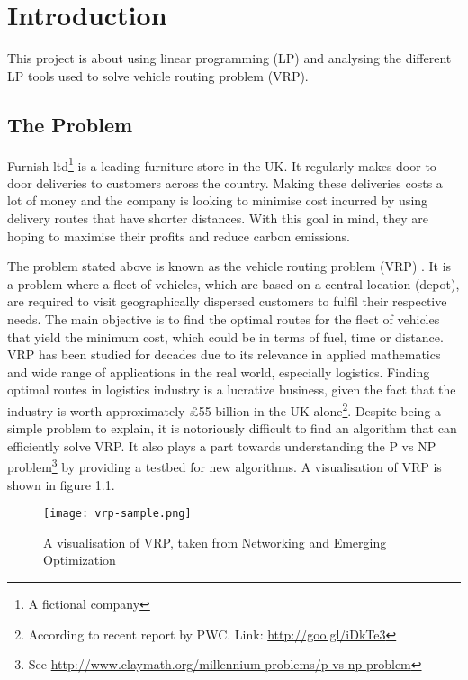 \chapter{Introduction}

This project is about using linear programming (LP) and analysing the different LP tools used to solve vehicle routing problem (VRP).

\section{The Problem}
Furnish ltd\footnote{A fictional company} is a leading furniture store in the UK. It regularly makes door-to-door deliveries to customers
across the country. Making these deliveries costs a lot of money and the company is looking to minimise cost incurred by using delivery routes
that have shorter distances. With this goal in mind, they are hoping to maximise their profits and reduce carbon emissions.

The problem stated above is known as the vehicle routing problem (VRP) \cite{Dantzig1959, Daneshzand2011}. It is a problem where a fleet of vehicles,
which are based on a central location (depot), are required to visit geographically dispersed customers
 to fulfil their respective needs. The main objective is to find the optimal routes for the fleet of vehicles that
 yield the minimum cost, which could be in terms of fuel, time or distance.
VRP has been studied for decades due to its relevance in applied mathematics and wide range of applications in the real world, especially logistics.
Finding optimal routes in logistics industry is a lucrative business, given the fact that the industry is worth approximately \pounds55 billion
in the UK alone\footnote{According to recent report by PWC. Link: \url{http://goo.gl/iDkTe3}}.
Despite being a simple problem to explain, it is notoriously difficult to find an algorithm that can efficiently solve VRP.
It also plays a part towards understanding the P vs NP problem\footnote{
See \url{http://www.claymath.org/millennium-problems/p-vs-np-problem}} by providing a testbed for new algorithms.
A visualisation of VRP is shown in figure 1.1.
\vspace{0.5cm}
\begin{figure}[!ht]
  \centering
    \texttt{[image: vrp-sample.png]}
    \caption{A visualisation of VRP, taken from Networking and Emerging Optimization \cite{neo:vrp}}
\end{figure}

